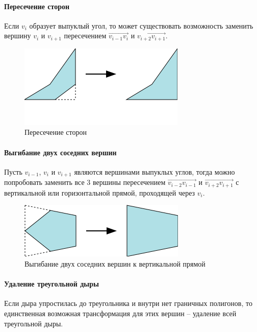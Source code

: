 \documentclass{fefu_thesis/cls/fefu}
\newcommand*\gray[1]{\overrightarrow{#1}}
\begin{document}
    \paragraph{Пересечение сторон}

    Если $v_i$ образует выпуклый угол, то может существовать возможность заменить вершину $v_i$ и $v_{i + 1}$ пересечением $\gray{v_{i - 1}v_i}$ и $\gray{v_{i + 2}v_{i + 1}}$.

    \begin{figure}[H]
        \centering
        \includegraphics[scale=1]{images/bendneighbor2.png}
        \caption{Пересечение сторон}
    \end{figure}

    \paragraph{Выгибание двух соседних вершин}

    Пусть $v_{i - 1}$, $v_{i}$ и $v_{i + 1}$ являются вершинами выпуклых углов, тогда можно попробовать заменить все 3 вершины пересечением $\gray{v_{i - 2}v_{i - 1}}$ и $\gray{v_{i + 2}v_{i + 1}}$ с вертикальной или горизонтальной прямой, проходящей через $v_i$.

    \begin{figure}[H]
        \centering
        \includegraphics[scale=1]{images/bendoutboth.png}
        \caption{Выгибание двух соседних вершин к вертикальной прямой}
    \end{figure}

    \paragraph{Удаление треугольной дыры}

    Если дыра упростилась до треугольника и внутри нет граничных полигонов, то единственная возможная трансформация для этих вершин -- удаление всей треугольной дыры.
\end{document}
